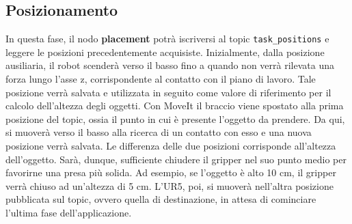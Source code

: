 \subsection{Posizionamento} \label{sub:placement}
In questa fase, il nodo \textbf{placement}\footnotemark{} potr\`{a} iscriversi al topic \verb|task_positions| e leggere le posizioni precedentemente 
acquisiste. Inizialmente, dalla posizione ausiliaria, il robot scender\`{a} verso il basso fino a quando non verr\`{a} rilevata 
una forza lungo l'asse z, corrispondente al contatto con il piano di lavoro. Tale posizione verr\`{a} salvata e utilizzata in seguito 
come valore di riferimento per il calcolo dell'altezza degli oggetti. 
Con MoveIt il braccio viene spostato alla prima posizione del topic, ossia il punto in cui \`{e} presente l'oggetto da prendere.
Da qui, si muover\`{a} verso il basso alla ricerca di un contatto con esso e una nuova posizione verr\`{a} salvata. 
Le differenza delle due posizioni corrisponde all'altezza dell'oggetto. Sar\`{a}, dunque, sufficiente chiudere il gripper 
nel suo punto medio per favorirne una presa pi\`{u} solida. Ad esempio, se l'oggetto \`{e} alto 10 cm, il gripper verr\`{a} chiuso 
ad un'altezza di 5 cm. 
L'UR5, poi, si muover\`{a} nell'altra posizione pubblicata sul topic, ovvero quella di destinazione, 
in attesa di cominciare l'ultima fase dell'applicazione.
